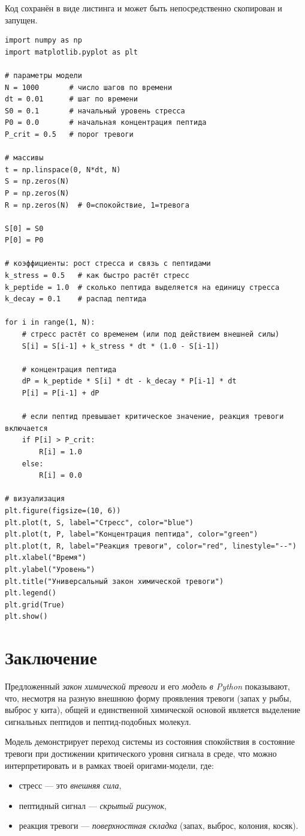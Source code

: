 \documentclass[12pt]{article}
\begin{document}
Код сохранён в виде листинга и может быть непосредственно скопирован и запущен.


\begin{lstlisting}
import numpy as np
import matplotlib.pyplot as plt

# параметры модели
N = 1000       # число шагов по времени
dt = 0.01      # шаг по времени
S0 = 0.1       # начальный уровень стресса
P0 = 0.0       # начальная концентрация пептида
P_crit = 0.5   # порог тревоги

# массивы
t = np.linspace(0, N*dt, N)
S = np.zeros(N)
P = np.zeros(N)
R = np.zeros(N)  # 0=спокойствие, 1=тревога

S[0] = S0
P[0] = P0

# коэффициенты: рост стресса и связь с пептидами
k_stress = 0.5   # как быстро растёт стресс
k_peptide = 1.0  # сколько пептида выделяется на единицу стресса
k_decay = 0.1    # распад пептида

for i in range(1, N):
    # стресс растёт со временем (или под действием внешней силы)
    S[i] = S[i-1] + k_stress * dt * (1.0 - S[i-1])

    # концентрация пептида
    dP = k_peptide * S[i] * dt - k_decay * P[i-1] * dt
    P[i] = P[i-1] + dP

    # если пептид превышает критическое значение, реакция тревоги включается
    if P[i] > P_crit:
        R[i] = 1.0
    else:
        R[i] = 0.0

# визуализация
plt.figure(figsize=(10, 6))
plt.plot(t, S, label="Стресс", color="blue")
plt.plot(t, P, label="Концентрация пептида", color="green")
plt.plot(t, R, label="Реакция тревоги", color="red", linestyle="--")
plt.xlabel("Время")
plt.ylabel("Уровень")
plt.title("Универсальный закон химической тревоги")
plt.legend()
plt.grid(True)
plt.show()
\end{lstlisting}

\section{Заключение}

Предложенный \emph{закон химической тревоги} и его \emph{модель в Python} показывают, что, несмотря на разную внешнюю форму проявления тревоги (запах у рыбы, выброс у кита), общей и единственной химической основой является выделение сигнальных пептидов и пептид‑подобных молекул.

Модель демонстрирует переход системы из состояния спокойствия в состояние тревоги при достижении критического уровня сигнала в среде, что можно интерпретировать и в рамках твоей оригами‑модели, где:
\begin{itemize}
  \item стресс — это \emph{внешняя сила},  
  \item пептидный сигнал — \emph{скрытый рисунок},  
  \item реакция тревоги — \emph{поверхностная складка} (запах, выброс, колония, косяк).
\end{itemize}
\end{document}
